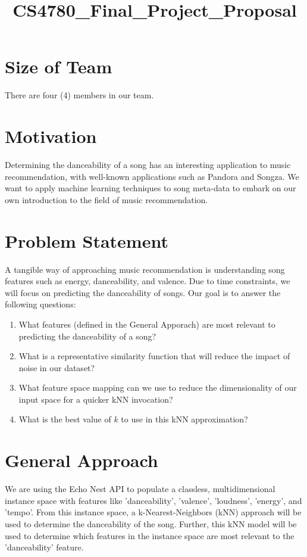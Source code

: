 \documentclass{article}
\title{CS4780_Final_Project_Proposal}
\begin{document}
 


\section{Size of Team}
There are four (4) members in our team. 

\section{Motivation}
Determining the danceability of a song has an interesting application to music recommendation, with well-known applications such as Pandora and Songza. We want to apply machine learning techniques to song meta-data to embark on our own introduction to the field of music recommendation.

\section{Problem Statement}
A tangible way of approaching music recommendation is understanding song features such as energy, danceability, and valence. Due to time constraints, we will focus on predicting the danceability of songs. Our goal is to answer the following questions:

\begin{enumerate}
\item What features (defined in the General Apporach) are most relevant to predicting the danceability of a song?
\item What is a representative similarity function that will reduce the impact of noise in our dataset?
\item What feature space mapping can we use to reduce the dimensionality of our input space for a quicker kNN invocation?
\item What is the best value of $ k $ to use in this kNN approximation? 
\end{enumerate}

\section{General Approach}
We are using the Echo Nest API to populate a classless, multidimensional instance space with features like 'danceability', 'valence', 'loudness', 'energy', and 'tempo'. From this instance space, a k-Nearest-Neighbors (kNN) approach will be used to determine the danceability of the song. Further, this kNN model will be used to determine which features in the instance space are most relevant to the 'danceability' feature.
\end{document}
